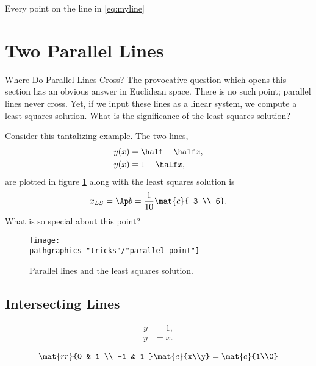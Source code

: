 Every point on the line in \eqref{eq:myline}

\section{Two Parallel Lines}  %
Where Do Parallel Lines Cross? The provocative question which opens this section has an obvious answer in Euclidean space. There is no such point; parallel lines never cross. Yet, if we input these lines as a linear system, we compute a least squares solution. What is the significance of the least squares solution?

Consider this tantalizing example. The two lines,
  \begin{equation*}   %
    \begin{split}
      y(x) &= \half - \half x, \\
      y(x) &= 1 - \half x,
    \end{split}
  \end{equation*}
are plotted in figure \ref{fig:tantalizing} along with the least squares solution is 
  \begin{equation*}   %
      x_{LS} = \Ap b = \frac{1}{10}\mat{c}{ 3 \\ 6}.
  \end{equation*}
What is so special about this point?
\begin{figure}[htbp] %
   \centering
     \texttt{[image: \\pathgraphics "tricks"/"parallel point"]} 
   \caption{Parallel lines and the least squares solution.}
   \label{fig:tantalizing}
\end{figure}

\subsection{Intersecting Lines}
  \begin{equation*}   %
   \begin{split}
      y &= 1, \\
      y &= x .
   \end{split}
  \end{equation*}

  \begin{equation*}   %
      \mat{rr}{0 & 1 \\ -1 & 1 }\mat{c}{x\\y} = \mat{c}{1\\0}
  \end{equation*}


